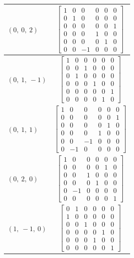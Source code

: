 \documentclass[11pt]{article}
\theoremstyle{definition}
\begin{document}
\begin{longtable}{|l|c|}
    \hline
    $\left( 0, \  0, \  2\right)$ & ${\left[\begin{matrix}1 & 0 & 0 & 0 & 0 & 0\\0 & 1 & 0 & 0 & 0 & 0\\0 & 0 & 0 & 0 & 0 & 1\\0 & 0 & 0 & 1 & 0 & 0\\0 & 0 & 0 & 0 & 1 & 0\\0 & 0 & -1 & 0 & 0 & 0\end{matrix}\right]}$ \\
    \hline
    $\left( 0, \  1, \  -1\right)$ & ${\left[\begin{matrix}1 & 0 & 0 & 0 & 0 & 0\\0 & 0 & 1 & 0 & 0 & 0\\0 & 1 & 0 & 0 & 0 & 0\\0 & 0 & 0 & 1 & 0 & 0\\0 & 0 & 0 & 0 & 0 & 1\\0 & 0 & 0 & 0 & 1 & 0\end{matrix}\right]}$ \\
    \hline
    $\left( 0, \  1, \  1\right)$ & ${\left[\begin{matrix}1 & 0 & 0 & 0 & 0 & 0\\0 & 0 & 0 & 0 & 0 & 1\\0 & 0 & 0 & 0 & 1 & 0\\0 & 0 & 0 & 1 & 0 & 0\\0 & 0 & -1 & 0 & 0 & 0\\0 & -1 & 0 & 0 & 0 & 0\end{matrix}\right]}$ \\
    \hline
    $\left( 0, \  2, \  0\right)$ & ${\left[\begin{matrix}1 & 0 & 0 & 0 & 0 & 0\\0 & 0 & 0 & 0 & 1 & 0\\0 & 0 & 1 & 0 & 0 & 0\\0 & 0 & 0 & 1 & 0 & 0\\0 & -1 & 0 & 0 & 0 & 0\\0 & 0 & 0 & 0 & 0 & 1\end{matrix}\right]}$ \\
    \hline
    $\left( 1, \  -1, \  0\right)$ & ${\left[\begin{matrix}0 & 1 & 0 & 0 & 0 & 0\\1 & 0 & 0 & 0 & 0 & 0\\0 & 0 & 1 & 0 & 0 & 0\\0 & 0 & 0 & 0 & 1 & 0\\0 & 0 & 0 & 1 & 0 & 0\\0 & 0 & 0 & 0 & 0 & 1\end{matrix}\right]}$ \\

\end{longtable}
\end{document}
